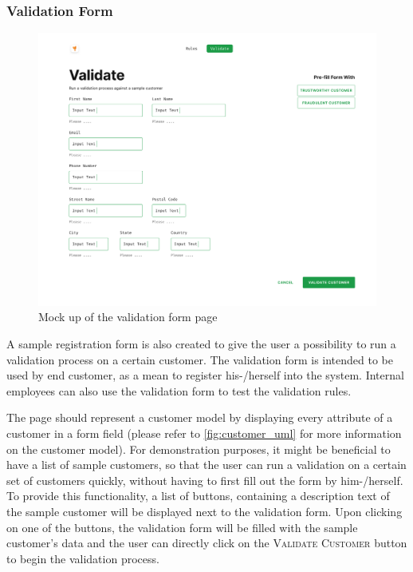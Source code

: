 \subsubsection{Validation Form}

\begin{figure}[!h]
 \includegraphics[width=\textwidth]{diagrams/mockup_validation_form.png}
 \caption{Mock up of the validation form page}
\end{figure}

A sample registration form is also created to give the user a possibility to run a validation process on a certain customer. The validation form is intended to be used by end customer, as a mean to register his-/herself into the system. Internal employees can also use the validation form to test the validation rules.

The page should represent a customer model by displaying every attribute of a customer in a form field (please refer to \autoref{fig:customer_uml} for more information on the customer model). For demonstration purposes, it might be beneficial to have a list of sample customers, so that the user can run a validation on a certain set of customers quickly, without having to first fill out the form by him-/herself. To provide this functionality, a list of buttons, containing a description text of the sample customer will be displayed next to the validation form. Upon clicking on one of the buttons, the validation form will be filled with the sample customer's data and the user can directly click on the \textsc{Validate Customer} button to begin the validation process.

